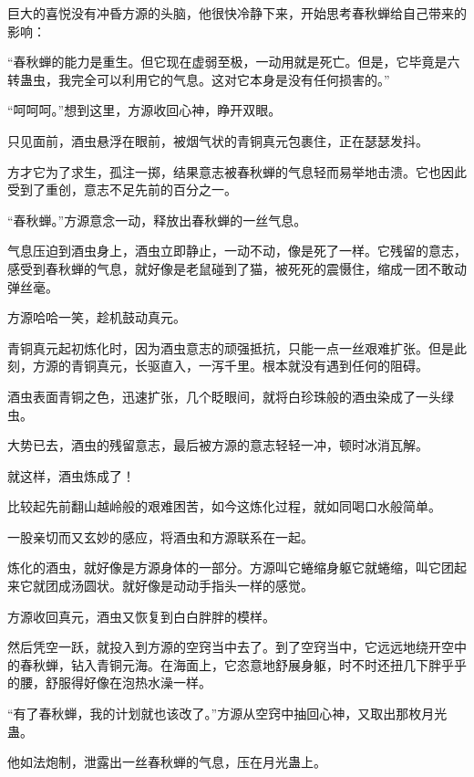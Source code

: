 
\begin{this_body}



巨大的喜悦没有冲昏方源的头脑，他很快冷静下来，开始思考春秋蝉给自己带来的影响：

“春秋蝉的能力是重生。但它现在虚弱至极，一动用就是死亡。但是，它毕竟是六转蛊虫，我完全可以利用它的气息。这对它本身是没有任何损害的。”

“呵呵呵。”想到这里，方源收回心神，睁开双眼。

只见面前，酒虫悬浮在眼前，被烟气状的青铜真元包裹住，正在瑟瑟发抖。

方才它为了求生，孤注一掷，结果意志被春秋蝉的气息轻而易举地击溃。它也因此受到了重创，意志不足先前的百分之一。

“春秋蝉。”方源意念一动，释放出春秋蝉的一丝气息。

气息压迫到酒虫身上，酒虫立即静止，一动不动，像是死了一样。它残留的意志，感受到春秋蝉的气息，就好像是老鼠碰到了猫，被死死的震慑住，缩成一团不敢动弹丝毫。

方源哈哈一笑，趁机鼓动真元。

青铜真元起初炼化时，因为酒虫意志的顽强抵抗，只能一点一丝艰难扩张。但是此刻，方源的青铜真元，长驱直入，一泻千里。根本就没有遇到任何的阻碍。

酒虫表面青铜之色，迅速扩张，几个眨眼间，就将白珍珠般的酒虫染成了一头绿虫。

大势已去，酒虫的残留意志，最后被方源的意志轻轻一冲，顿时冰消瓦解。

就这样，酒虫炼成了！

比较起先前翻山越岭般的艰难困苦，如今这炼化过程，就如同喝口水般简单。

一股亲切而又玄妙的感应，将酒虫和方源联系在一起。

炼化的酒虫，就好像是方源身体的一部分。方源叫它蜷缩身躯它就蜷缩，叫它团起来它就团成汤圆状。就好像是动动手指头一样的感觉。

方源收回真元，酒虫又恢复到白白胖胖的模样。

然后凭空一跃，就投入到方源的空窍当中去了。到了空窍当中，它远远地绕开空中的春秋蝉，钻入青铜元海。在海面上，它恣意地舒展身躯，时不时还扭几下胖乎乎的腰，舒服得好像在泡热水澡一样。

“有了春秋蝉，我的计划就也该改了。”方源从空窍中抽回心神，又取出那枚月光蛊。

他如法炮制，泄露出一丝春秋蝉的气息，压在月光蛊上。


\end{this_body}
